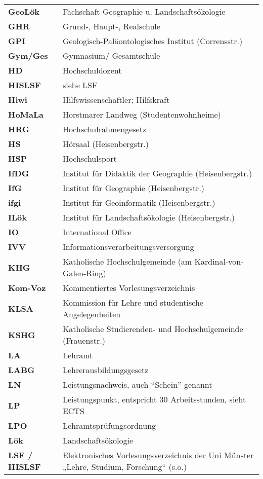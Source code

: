 \begin{longtable}{p{} p{}}
  \textbf{GeoLök} & Fachschaft Geographie u. Landschaftsökologie\\
  \textbf{GHR} & Grund-, Haupt-, Realschule\\
  \textbf{GPI} & Geologisch-Paläontologisches Institut (Corrensstr.)\\
  \textbf{Gym/Ges} & Gymnasium/ Gesamtschule\\
  \textbf{HD} & Hochschuldozent\\
  \textbf{HISLSF} & siehe LSF\\
  \textbf{Hiwi} & Hilfswissenschaftler; Hilfskraft\\
  \textbf{HoMaLa} & Horstmarer Landweg (Studentenwohnheime)\\
  \textbf{HRG} & Hochschulrahmengesetz\\
  \textbf{HS} & Hörsaal (Heisenbergstr.)\\
  \textbf{HSP} & Hochschulsport\\
  \textbf{IfDG} & Institut für Didaktik der Geographie (Heisenbergstr.)\\
  \textbf{IfG} & Institut für Geographie (Heisenbergstr.)\\
  \textbf{ifgi} & Institut für Geoinformatik (Heisenbergstr.)\\
  \textbf{ILök} & Institut für Landschaftsökologie (Heisenbergstr.)\\
  \textbf{IO} & International Office\\
  \textbf{IVV} & Informationsverarbeitungsversorgung\\
  \textbf{KHG} & Katholische Hochschulgemeinde (am Kardinal-von-Galen-Ring)\\
  \textbf{Kom-Voz} & Kommentiertes Vorlesungsverzeichnis\\
  \textbf{KLSA} & Kommission für Lehre und studentische Angelegenheiten\\
  \textbf{KSHG} & Katholische Studierenden- und Hochschulgemeinde (Frauenstr.)\\
  \textbf{LA} & Lehramt\\
  \textbf{LABG} & Lehrerausbildungsgesetz\\
  \textbf{LN} & Leistungsnachweis, auch "`Schein"' genannt\\
  \textbf{LP} & Leistungspunkt, entspricht 30 Arbeitsstunden, sieht ECTS\\ 
  \textbf{LPO} & Lehramtsprüfungsordnung\\
  \textbf{Lök} & Landschaftsökologie\\
  \textbf{LSF / HISLSF} & Elektronisches Vorlesungsverzeichnis der Uni Münster „Lehre, Studium, Forschung“ (s.o.)\\

\end{longtable}
